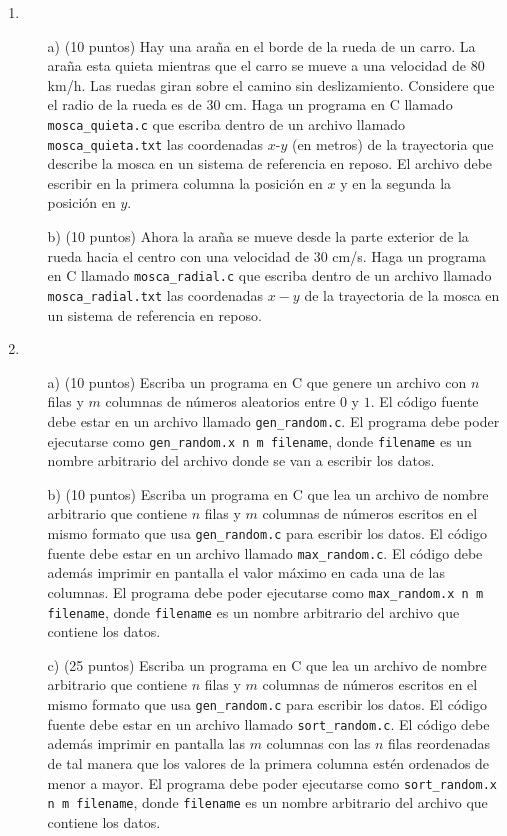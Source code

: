 \documentclass{article}
\begin{document}
\begin{enumerate}

\item 
\begin{itemize}
\item[a)] (10 puntos) Hay una araña en el borde de la rueda de un
  carro. La araña esta quieta mientras que el carro se mueve a una
  velocidad de $8$0 km/h. Las ruedas giran sobre el camino sin
  deslizamiento. Considere que el radio de la rueda es de 30
  cm. Haga un programa en C llamado \verb"mosca_quieta.c" que
  escriba dentro de un archivo llamado \verb"mosca_quieta.txt" las
  coordenadas $x$-$y$ (en metros) de la trayectoria que describe la mosca en un
  sistema de referencia en reposo. El archivo debe escribir en la
  primera columna la posici\'on en $x$ y en la segunda la posici\'on
  en $y$.

\item[b)] (10 puntos) Ahora la araña se mueve desde la parte exterior
  de la rueda hacia el centro con una velocidad de $30$ cm/s. Haga un
  programa en C llamado \verb"mosca_radial.c" que escriba dentro de un
  archivo llamado \verb"mosca_radial.txt" las coordenadas $x-y$ de la
  trayectoria de la mosca en un sistema de referencia en reposo. 
\end{itemize}

\item
\begin{itemize}
\item[a)] (10 puntos) Escriba un programa en C que genere un archivo
  con $n$ filas y $m$ columnas de n\'umeros aleatorios entre $0$ y
  $1$. El c\'odigo fuente debe estar en un archivo llamado
  \verb"gen_random.c". El programa debe poder ejecutarse como
  \verb"gen_random.x n m filename", donde \verb"filename" es un nombre
  arbitrario del archivo donde se van a escribir los datos. 

\item[b)] (10 puntos) 
Escriba un programa en C que lea un archivo de nombre arbitrario que
contiene $n$ filas y $m$ columnas de n\'umeros escritos en el mismo
formato que usa \verb"gen_random.c" para escribir los datos. El
c\'odigo fuente debe estar en un archivo llamado
\verb"max_random.c". El c\'odigo debe adem\'as imprimir en pantalla el
valor m\'aximo en cada una de las columnas. El programa debe poder
ejecutarse como \verb"max_random.x n m filename", donde
\verb"filename" es un nombre arbitrario del archivo que contiene los
datos. 

\item[c)] (25 puntos) Escriba un programa en C que lea un archivo de
  nombre arbitrario que contiene $n$ filas y $m$ columnas de n\'umeros
  escritos en el mismo formato que usa \verb"gen_random.c" para
  escribir los datos. El c\'odigo fuente debe estar en un archivo
  llamado \verb"sort_random.c". El c\'odigo debe adem\'as imprimir en
  pantalla las $m$ columnas con las $n$ filas reordenadas de tal
  manera que los valores de la primera columna est\'en ordenados de
  menor a mayor. El programa debe poder ejecutarse como 
  \verb"sort_random.x n m filename", donde \verb"filename" es un
  nombre arbitrario del archivo que contiene los datos. 


\end{itemize}
\end{enumerate}
\end{document}
